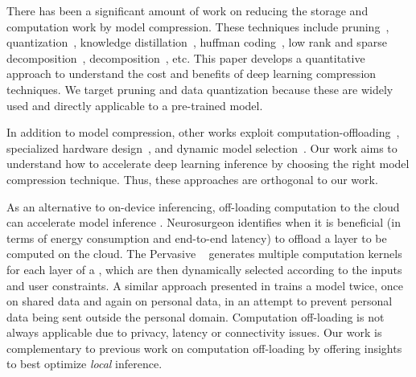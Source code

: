 There has been a significant amount of work on reducing the storage and computation work by model compression. These techniques include
pruning~\cite{Li2016Pruning}, quantization~\cite{Gong2014Compressing,han2015deep}, knowledge
distillation~\cite{hinton2015distilling,Sau2016Deep}, huffman coding~\cite{han2015deep}, low rank and sparse decomposition~\cite{denton2014exploiting}, decomposition~\cite{lebedev2014speeding}, etc. This paper develops a quantitative approach to
understand the cost and benefits of deep learning compression techniques. We target pruning and data quantization because these are widely
used and directly applicable to a pre-trained model.



In addition to model compression, other works exploit computation-offloading~\cite{teerapittayanon2017distributed,Kang2017neurosurgeon},
specialized hardware design~\cite{chen2017eyeriss,Han:2016:EEI:3001136.3001163}, and dynamic model
selection~\cite{Taylor:2018:ADL:3211332.3211336}. Our work aims to understand how to accelerate deep learning inference by choosing the
right model compression technique. Thus, these approaches are orthogonal to our work.


As an alternative to on-device inferencing, off-loading computation to the cloud can accelerate \DNN model inference
\cite{teerapittayanon2017distributed}. Neurosurgeon \cite{Kang2017neurosurgeon} identifies when it is beneficial (\eg in terms of energy
consumption and end-to-end latency) to offload a \DNN layer to be computed on the cloud. The Pervasive \CNN~\cite{song2017towards}
generates multiple computation kernels for each layer of a \CNN, which are then dynamically selected according to the inputs and user
constraints. A similar approach presented in \cite{servia2017personal} trains a model twice, once on shared data and again on personal
data, in an attempt to prevent personal data being sent outside the personal domain. Computation off-loading is not always applicable due
to privacy, latency or connectivity issues. Our work is complementary to previous work on computation off-loading by offering insights to
best optimize \emph{local} inference.




